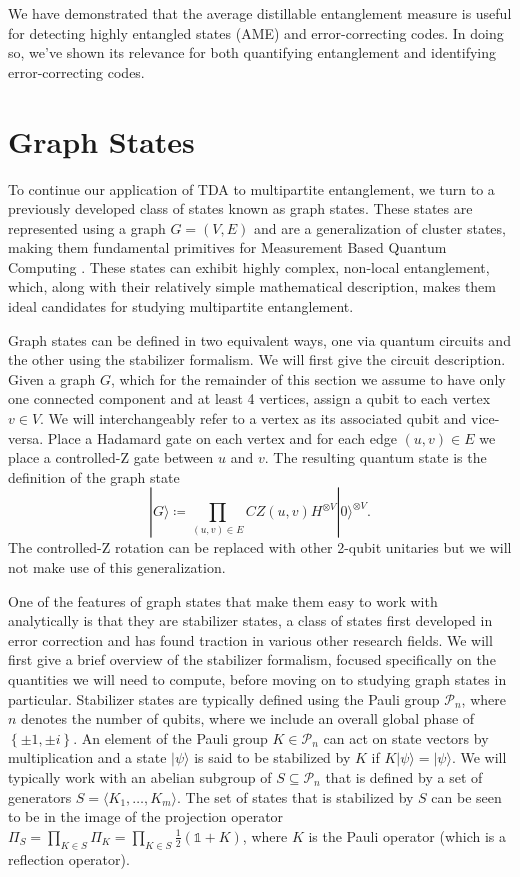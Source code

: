\documentclass{article}
\newcommand{\ket}[1]{|#1\rangle}
\newcommand{\set}[1]{\left\{ #1 \right\}}
\newcommand{\identity}{\mathds{1}}
\begin{document}
We have demonstrated that the average distillable entanglement measure is useful for detecting highly entangled states (AME) and error-correcting codes. In doing so, we've shown its relevance for both quantifying entanglement and identifying error-correcting codes.

\section{Graph States} \label{sec:graph_states}

To continue our application of TDA to multipartite entanglement, we turn to a previously developed class of states known as graph states. These states are represented using a graph $G = (V, E)$ and are a generalization of cluster states, making them fundamental primitives for Measurement Based Quantum Computing \cite{nielsen2006}. These states can exhibit highly complex, non-local entanglement, which, along with their relatively simple mathematical description, makes them ideal candidates for studying multipartite entanglement. 

Graph states can be defined in two equivalent ways, one via quantum circuits and the other using the stabilizer formalism. We will first give the circuit description. Given a graph $G$, which for the remainder of this section we assume to have only one connected component and at least 4 vertices, assign a qubit to each vertex $v \in V$. We will interchangeably refer to a vertex as its associated qubit and vice-versa. Place a Hadamard gate on each vertex and for each edge $(u, v) \in E$ we place a controlled-Z gate between $u$ and $v$. The resulting quantum state is the definition of the graph state
\begin{equation}
    \ket{G} \coloneqq \prod_{(u, v) \in E} CZ(u, v) H^{\otimes V} \ket{0}^{\otimes V}. \label{def:graph_state}
\end{equation}
The controlled-Z rotation can be replaced with other 2-qubit unitaries but we will not make use of this generalization.

One of the features of graph states that make them easy to work with analytically is that they are stabilizer states, a class of states first developed in error correction and has found traction in various other research fields. We will first give a brief overview of the stabilizer formalism, focused specifically on the quantities we will need to compute, before moving on to studying graph states in particular. Stabilizer states are typically defined using the Pauli group $\mathcal{P}_n$, where $n$ denotes the number of qubits, where we include an overall global phase of $\set{\pm 1, \pm i}$. An element of the Pauli group $K \in \mathcal{P}_n$ can act on state vectors by multiplication and a state $\ket{\psi}$ is said to be stabilized by $K$ if $K \ket{\psi} = \ket{\psi}$. We will typically work with an abelian subgroup of $S \subseteq \mathcal{P}_n$ that is defined by a set of generators $S = \langle K_1, \ldots, K_m \rangle$. The set of states that is stabilized by $S$ can be seen to be in the image of the projection operator $\Pi_S = \prod_{K \in S} \Pi_K = \prod_{K \in S} \frac{1}{2}(\identity + K)$, where $K$ is the Pauli operator (which is a reflection operator).
\end{document}
